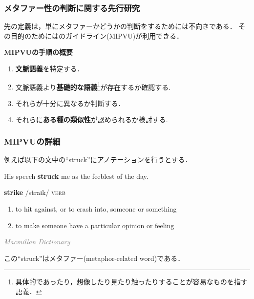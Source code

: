 \documentclass[12pt,usepdftitle=false]{beamer}
\begin{document}
\begin{frame}
    \frametitle{メタファー性の判断に関する先行研究}

    先の定義は，単にメタファーかどうかの判断をするためには不向きである．
    その目的のためには\citet{steen2010}のガイドライン(MIPVU)が利用できる．

	\bigskip

    \textbf{MIPVUの手順の概要}

    \begin{enumerate}
        \item \textbf{文脈語義}を特定する．
        \item 文脈語義より\textbf{基礎的な語義}\footnote[frame]{具体的であったり，想像したり見たり触ったりすることが容易なものを指す語義．}が存在するか確認する.
        \item それらが十分に異なるか判断する．
        \item それらに\textbf{ある種の類似性}が認められるか検討する.
    \end{enumerate}
\end{frame}

\begin{frame}
    \frametitle{MIPVUの詳細}
    例えば以下の文中の``struck''にアノテーションを行うとする．
    \begin{center}
        His speech \textbf{struck} me as the feeblest of the day.
    \end{center}

    \begin{leftbar}
        \textbf{strike} {\phonetic /straɪk/} \textsc{verb}
        \begin{enumerate}
            \item to hit against, or to crash into, someone or something
            \item to make someone have a particular opinion or feeling
        \end{enumerate}

         \hfill\textcolor{gray}{\emph{Macmillan Dictionary}}
    \end{leftbar}

	 この``struck''はメタファー(metaphor-related word)である．
\end{frame}
\end{document}
